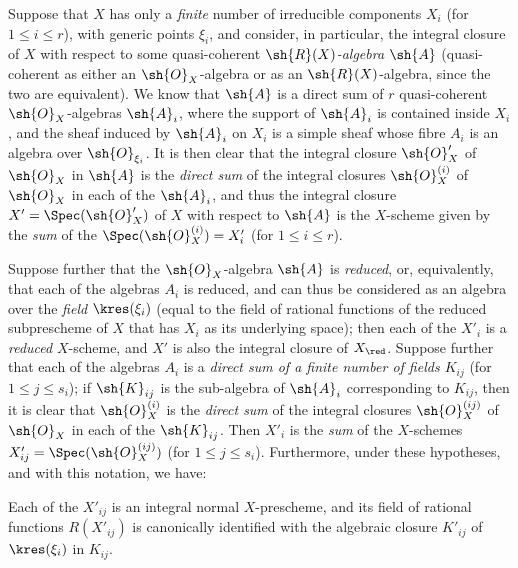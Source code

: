 \begin{env}[6.3.6]
\label{II.6.3.6}
Suppose that $X$ has only a \emph{finite} number of irreducible components $X_i$ (for $1\leq i\leq r$), with generic points $\xi_i$, and consider, in particular, the integral closure of $X$ with respect to some quasi-coherent \emph{$\sh{R}(X)$-algebra} $\sh{A}$ (quasi-coherent as either an $\sh{O}_X$-algebra or as an $\sh{R}(X)$-algebra, since the two are equivalent).
We know  that $\sh{A}$ is a direct sum of $r$ quasi-coherent $\sh{O}_X$-algebras $\sh{A}_i$, where the support of $\sh{A}_i$ is contained inside $X_i$, and the sheaf induced by $\sh{A}_i$ on $X_i$ is a simple sheaf whose fibre $A_i$ is an algebra over $\sh{O}_{\xi_i}$.
It is then clear  that the integral closure $\sh{O}'_X$ of $\sh{O}_X$ in $\sh{A}$ is the \emph{direct sum} of the integral closures $\sh{O}_X^{(i)}$ of $\sh{O}_X$ in each of the $\sh{A}_i$, and thus the integral closure $X'=\Spec(\sh{O}'_X)$ of $X$ with respect to $\sh{A}$ is the $X$-scheme given by the \emph{sum} of the $\Spec(\sh{O}_X^{(i)})=X'_i$ (for $1\leq i\leq r$).

Suppose further that the $\sh{O}_X$-algebra $\sh{A}$ is \emph{reduced}, or, equivalently, that each of the algebras $A_i$ is reduced, and can thus be considered as an algebra over the \emph{field} $\kres(\xi_i)$ (equal to the field of rational functions of the reduced subprescheme of $X$ that has $X_i$ as its underlying space);
then  each of the $X'_i$ is a \emph{reduced} $X$-scheme, and $X'$ is also the integral closure of $X_\red$.
Suppose further that each of the algebras $A_i$ is a \emph{direct sum of a finite number of fields $K_{ij}$} (for $1\leq j\leq s_i$);
if $\sh{K}_{ij}$ is the sub-algebra of $\sh{A}_i$ corresponding to $K_{ij}$, then it is clear that $\sh{O}_X^{(i)}$ is the \emph{direct sum} of the integral closures $\sh{O}_X^{(ij)}$ of $\sh{O}_X$ in each of the $\sh{K}_{ij}$.
Then $X'_i$ is the \emph{sum} of the $X$-schemes $X'_{ij}=\Spec(\sh{O}_X^{(ij)})$ (for $1\leq j\leq s_i$).
Furthermore, under these hypotheses, and with this notation, we have:
\end{env}

\begin{proposition}[6.3.7]
\label{II.6.3.7}
Each of the $X'_{ij}$ is an integral normal $X$-prescheme, and its field of rational functions $R(X'_{ij})$ is canonically identified with the algebraic closure $K'_{ij}$ of $\kres(\xi_i)$ in $K_{ij}$.
\end{proposition}

